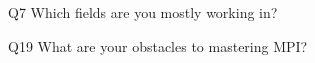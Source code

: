 \begin{description}%
\item{Q7} Which fields are you mostly working in?%
\item{Q19} What are your obstacles to mastering MPI?%
\end{description}%
